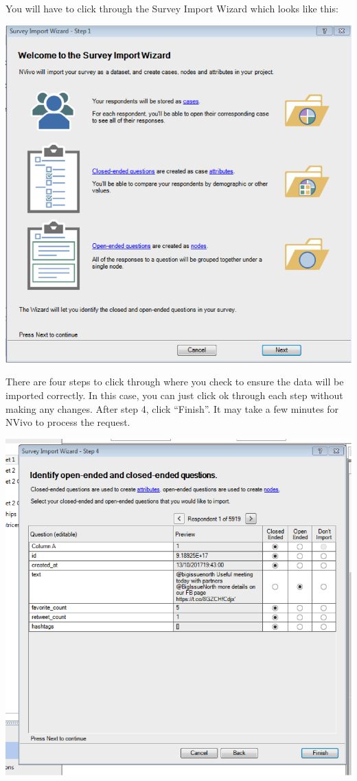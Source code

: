 \documentclass[]{book}
\theoremstyle{definition}
\theoremstyle{definition}
\theoremstyle{definition}
\theoremstyle{remark}
\begin{document}
You will have to click through the Survey Import Wizard which looks like
this:

\includegraphics{imgs/qual_36.png}

There are four steps to click through where you check to ensure the data
will be imported correctly. In this case, you can just click ok through
each step without making any changes. After step 4, click ``Finish''. It
may take a few minutes for NVivo to process the request.

\includegraphics{imgs/qual_37.png}
\end{document}
